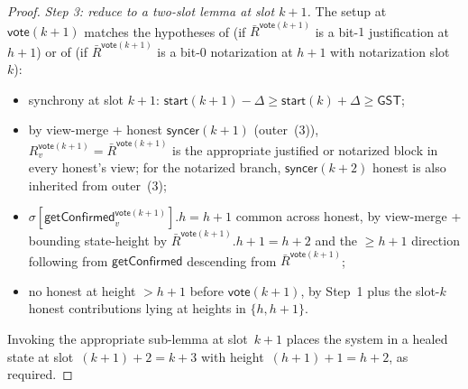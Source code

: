 \ifx\litemode\undefined\documentclass{article}\fi
\newcommand{\syncer}{\mathsf{syncer}}
\newcommand{\start}{\mathsf{start}}
\newcommand{\vote}{\mathsf{vote}}
\newcommand{\comm}[1]{\bar{#1}}
\newcommand{\getConfirmed}{\textsf{getConfirmed}\xspace}
\theoremstyle{plain}
\theoremstyle{definition}
\theoremstyle{remark}
\newcommand{\GST}{\ensuremath{\mathsf{GST}}}
\begin{document}
\begin{proof}
\emph{Step 3: reduce to a two-slot lemma at slot $k+1$.}
The setup at $\vote(k+1)$ matches the hypotheses of  (if $\comm{R}^{\vote(k+1)}$ is a bit-$1$ justification at $h+1$) or of  (if $\comm{R}^{\vote(k+1)}$ is a bit-$0$ notarization at $h+1$ with notarization slot~$k$):
\begin{itemize}
  \item synchrony at slot $k+1$: $\start(k+1) - \Delta \geq \start(k) + \Delta \geq \GST$;
  \item by view-merge + honest $\syncer(k+1)$ (outer~(3)), $R_v^{\vote(k+1)} = \comm{R}^{\vote(k+1)}$ is the appropriate justified or notarized block in every honest's view; for the notarized branch, $\syncer(k+2)$ honest is also inherited from outer~(3);
  \item $\sigma[\getConfirmed_v^{\vote(k+1)}].h = h+1$ common across honest, by view-merge +  bounding state-height by $\comm{R}^{\vote(k+1)}.h + 1 = h+2$ and the $\geq h+1$ direction following from $\getConfirmed$ descending from $\comm{R}^{\vote(k+1)}$;
  \item no honest at height $>h+1$ before $\vote(k+1)$, by Step~1 plus the slot-$k$ honest contributions lying at heights in $\{h, h+1\}$.
\end{itemize}
Invoking the appropriate sub-lemma at slot~$k+1$ places the system in a healed state at slot~$(k+1)+2 = k+3$ with height~$(h+1)+1 = h+2$, as required.
\end{proof}
\end{document}
